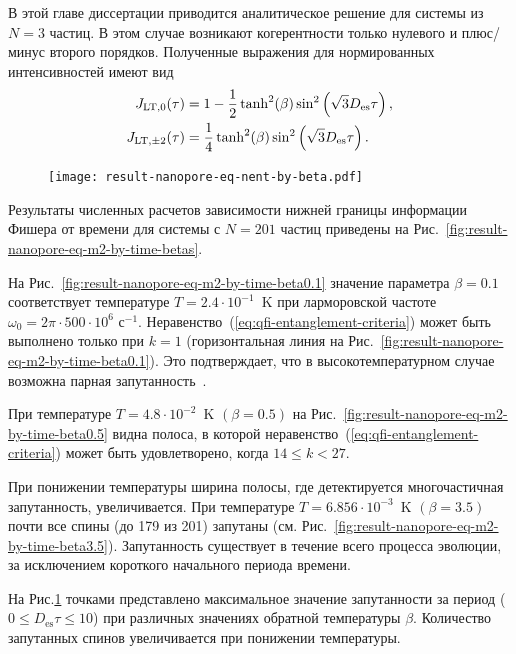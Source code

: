 В этой главе диссертации приводится аналитическое решение для системы из $N=3$ частиц.
В этом случае возникают когерентности только нулевого и плюс/минус второго порядков.
Полученные выражения для нормированных интенсивностей имеют вид
%
\begin{align}\label{eq:j_lt_3}
  J_{\mathrm{LT}, 0}(\tau) & = 1 - \frac 1 2 \tanh^2(\beta)\sin^2\left( \sqrt 3 D_\mathrm{es} \tau \right), \\
  J_{\mathrm{LT},\pm 2}(\tau) & = \frac 1 4 \tanh^2(\beta)\sin^2\left( \sqrt 3 D_\mathrm{es} \tau \right).
\end{align}

\begin{figure}
  \texttt{[image: result-nanopore-eq-nent-by-beta.pdf]}
  \caption{\protect}
  \label{fig:result-nanopore-eq-nent-by-beta}
\end{figure}

Результаты численных расчетов зависимости нижней границы информации Фишера от времени для системы с $N=201$ частиц приведены на Рис.~\ref{fig:result-nanopore-eq-m2-by-time-betas}.

На Рис.~\ref{fig:result-nanopore-eq-m2-by-time-beta0.1} значение параметра $\beta = 0.1$ соответствует температуре ${T= 2.4\cdot 10^{-1}}$~K при ларморовской частоте $\omega_0 = 2\pi\cdot 500\cdot10^6$ с$^{-1}$.
Неравенство~(\ref{eq:qfi-entanglement-criteria}) может быть выполнено только при $k=1$ (горизонтальная линия на Рис.~\ref{fig:result-nanopore-eq-m2-by-time-beta0.1}).
Это подтверждает, что в высокотемпературном случае возможна парная запутанность~\cite{Feldman2012}.

При температуре $T = {4.8\cdot10^{-2}}$~K $(\beta=0.5)$ на Рис.~\ref{fig:result-nanopore-eq-m2-by-time-beta0.5} видна полоса, в которой неравенство~(\ref{eq:qfi-entanglement-criteria}) может быть удовлетворено, когда $14 \leq k < 27$.

При понижении температуры ширина полосы, где детектируется многочастичная запутанность, увеличивается.
При температуре $T= 6.856\cdot10^{-3}$~K $(\beta=3.5)$
почти все спины (до 179 из 201) запутаны (см. Рис.~\ref{fig:result-nanopore-eq-m2-by-time-beta3.5}).
Запутанность существует в течение всего процесса эволюции, за исключением короткого начального периода времени.

На Рис.\ref{fig:result-nanopore-eq-nent-by-beta} точками представлено максимальное значение запутанности за период ($0 \leq D_\mathrm{es}\tau \leq 10$) при различных значениях обратной температуры $\beta$.
Количество запутанных спинов увеличивается при понижении температуры.

